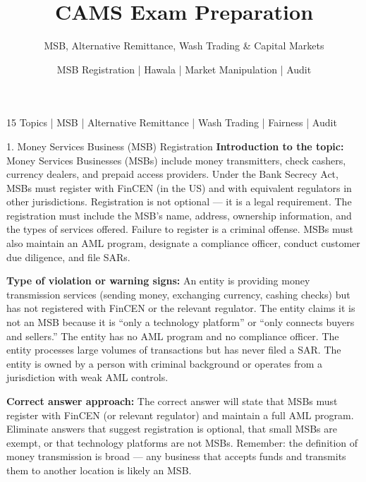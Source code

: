 \documentclass[11pt,a4paper]{beamer}
\title[CAMS Exam Preparation]{CAMS Exam Preparation}
\subtitle{MSB, Alternative Remittance, Wash Trading \& Capital Markets}
\author{MSB Registration | Hawala | Market Manipulation | Audit}
\date{}
\begin{document}
\begin{frame}
\titlepage
\centering
\tiny 15 Topics | MSB | Alternative Remittance | Wash Trading | Fairness | Audit
\end{frame}

\begin{frame}{1. Money Services Business (MSB) Registration}
\tiny
\noindent\textbf{Introduction to the topic:} Money Services Businesses (MSBs) include money transmitters, check cashers, currency dealers, and prepaid access providers. Under the Bank Secrecy Act, MSBs must register with FinCEN (in the US) and with equivalent regulators in other jurisdictions. Registration is not optional — it is a legal requirement. The registration must include the MSB's name, address, ownership information, and the types of services offered. Failure to register is a criminal offense. MSBs must also maintain an AML program, designate a compliance officer, conduct customer due diligence, and file SARs.

\vspace{0.1cm}
\noindent\textbf{Type of violation or warning signs:} An entity is providing money transmission services (sending money, exchanging currency, cashing checks) but has not registered with FinCEN or the relevant regulator. The entity claims it is not an MSB because it is “only a technology platform” or “only connects buyers and sellers.” The entity has no AML program and no compliance officer. The entity processes large volumes of transactions but has never filed a SAR. The entity is owned by a person with criminal background or operates from a jurisdiction with weak AML controls.

\vspace{0.1cm}
\noindent\textbf{Correct answer approach:} The correct answer will state that MSBs must register with FinCEN (or relevant regulator) and maintain a full AML program. Eliminate answers that suggest registration is optional, that small MSBs are exempt, or that technology platforms are not MSBs. Remember: the definition of money transmission is broad — any business that accepts funds and transmits them to another location is likely an MSB.
\end{frame}
\end{document}
